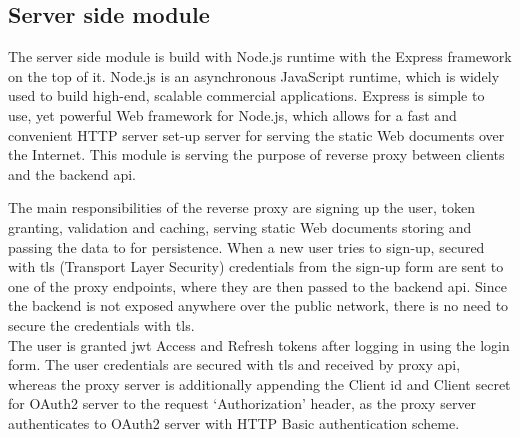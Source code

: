 
\subsection{Server side module}\label{subsec:server-side-module}
The server side module is build with Node.js runtime with the Express framework on the top of it.
Node.js is an asynchronous JavaScript runtime, which is widely used to build high-end, scalable commercial applications.
Express is simple to use, yet powerful Web framework for Node.js, which allows for a fast and convenient HTTP server set-up server for serving the static Web documents over the Internet.
This module is serving the purpose of reverse proxy between clients and the backend \gls{api}.

The main responsibilities of the reverse proxy are signing up the user, token granting, validation and caching, serving static Web documents storing and passing the data to for persistence.
When a new user tries to sign-up, secured with \gls{tls} (Transport Layer Security) credentials from the sign-up form are sent to one of the proxy endpoints, where they are then passed to the backend \gls{api}.
Since the backend is not exposed anywhere over the public network, there is no need to secure the credentials with \gls{tls}.\\
The user is granted \gls{jwt} Access and Refresh tokens after logging in using the login form.
The user credentials are secured with \gls{tls} and received by proxy \gls{api}, whereas the proxy server is additionally appending the Client id and Client secret for OAuth2 server to the request `Authorization' header, as the proxy server authenticates to OAuth2 server with HTTP Basic authentication scheme.

